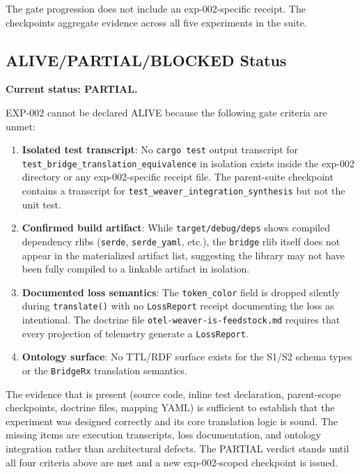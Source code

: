 The gate progression does not include an exp-002-specific receipt. The checkpoints
aggregate evidence across all five experiments in the suite.

\subsection{ALIVE/PARTIAL/BLOCKED Status}
\label{sec:otel-weaver-exp-002-diff-to-residual-evidence-status}

\textbf{Current status: PARTIAL.}

EXP-002 cannot be declared ALIVE because the following gate criteria are unmet:

\begin{enumerate}
    \item \textbf{Isolated test transcript}: No \texttt{cargo test} output transcript
          for \texttt{test\_bridge\_translation\_equivalence} in isolation exists
          inside the exp-002 directory or any exp-002-specific receipt file. The
          parent-suite checkpoint contains a transcript for
          \texttt{test\_weaver\_integration\_synthesis} but not the unit test.

    \item \textbf{Confirmed build artifact}: While \texttt{target/debug/deps} shows
          compiled dependency rlibs (\texttt{serde}, \texttt{serde\_yaml}, etc.),
          the \texttt{bridge} rlib itself does not appear in the materialized
          artifact list, suggesting the library may not have been fully compiled to
          a linkable artifact in isolation.

    \item \textbf{Documented loss semantics}: The \texttt{token\_color} field is
          dropped silently during \texttt{translate()} with no \texttt{LossReport}
          receipt documenting the loss as intentional. The doctrine file
          \texttt{otel-weaver-is-feedstock.md} requires that every projection of
          telemetry generate a \texttt{LossReport}.

    \item \textbf{Ontology surface}: No TTL/RDF surface exists for the S1/S2 schema
          types or the \texttt{BridgeRx} translation semantics.
\end{enumerate}

The evidence that is present (source code, inline test declaration, parent-scope
checkpoints, doctrine files, mapping YAML) is sufficient to establish that the
experiment was designed correctly and its core translation logic is sound. The
missing items are execution transcripts, loss documentation, and ontology
integration rather than architectural defects. The PARTIAL verdict stands until
all four criteria above are met and a new exp-002-scoped checkpoint is issued.
